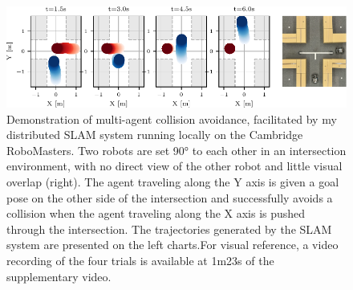 \begin{figure}[h]
    \centering
    \includegraphics[width=\linewidth]{figures/mar25_1_tracer_graph.pdf}

    \caption{Demonstration of multi-agent collision avoidance, facilitated by my distributed SLAM system running locally on the Cambridge RoboMasters. Two robots are set 90° to each other in an intersection environment, with no direct view of the other robot and little visual overlap (right). The agent traveling along the Y axis is given a goal pose on the other side of the intersection and successfully avoids a collision when the agent traveling along the X axis is pushed through the intersection. The trajectories generated by the SLAM system are presented on the left charts.\captionbreak For visual reference, a video recording of the four trials is available at 1m23s  of the supplementary video\protect\footnotemark[1] .}
    \label{fig:collision-avoidance}
\end{figure}

